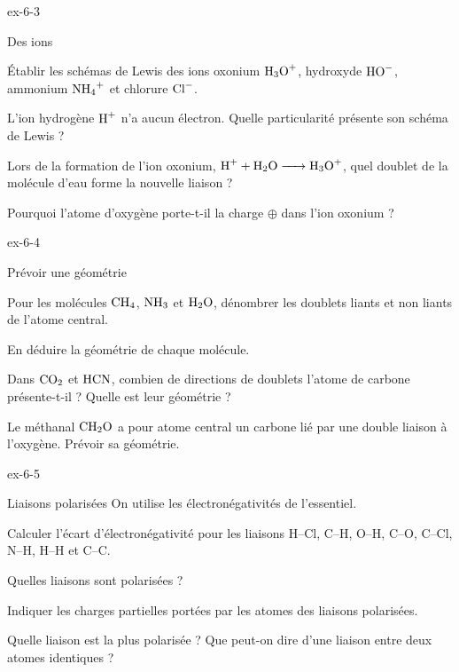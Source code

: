 \begin{blocLivre}{ex-6-3}
\begin{exercice}[1]{Des ions}
\begin{questions}
\item Établir les schémas de Lewis des ions oxonium $\ce{H3O+}$, hydroxyde $\ce{HO-}$, ammonium $\ce{NH4+}$ et chlorure $\ce{Cl-}$.
\item L'ion hydrogène $\ce{H+}$ n'a aucun électron. Quelle particularité présente son schéma de Lewis ?
\item Lors de la formation de l'ion oxonium, $\ce{H+ + H2O -> H3O+}$, quel doublet de la molécule d'eau forme la nouvelle liaison ?
\item Pourquoi l'atome d'oxygène porte-t-il la charge $\oplus$ dans l'ion oxonium ?
\end{questions}
\end{exercice}
\end{blocLivre}
\begin{blocLivre}{ex-6-4}
\begin{exercice}[1]{Prévoir une géométrie}
\begin{questions}
\item Pour les molécules $\ce{CH4}$, $\ce{NH3}$ et $\ce{H2O}$, dénombrer les doublets liants et non liants de l'atome central.
\item En déduire la géométrie de chaque molécule.
\item Dans $\ce{CO2}$ et $\ce{HCN}$, combien de directions de doublets l'atome de carbone présente-t-il ? Quelle est leur géométrie ?
\item Le méthanal $\ce{CH2O}$ a pour atome central un carbone lié par une double liaison à l'oxygène. Prévoir sa géométrie.
\end{questions}
\end{exercice}
\end{blocLivre}
\begin{blocLivre}{ex-6-5}
\begin{exercice}[1]{Liaisons polarisées}
On utilise les électronégativités de l'essentiel.
\begin{questions}
\item Calculer l'écart d'électronégativité pour les liaisons H--Cl, C--H, O--H, C--O, C--Cl, N--H, H--H et C--C.
\item Quelles liaisons sont polarisées ?
\item Indiquer les charges partielles portées par les atomes des liaisons polarisées.
\item Quelle liaison est la plus polarisée ? Que peut-on dire d'une liaison entre deux atomes identiques ?
\end{questions}
\end{exercice}
\end{blocLivre}
